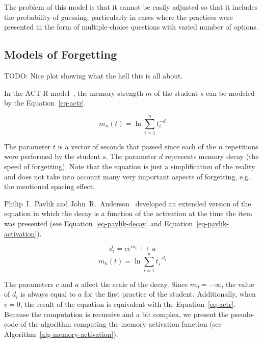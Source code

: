 The problem of this model is that it cannot be easily adjusted so that it includes the probability of guessing, particularly in cases where the practices were presented in the form of multiple-choice questions with varied number of options.

\subsection{Models of Forgetting}
\label{spacing-effect}

TODO: Nice plot showing what the hell this is all about.

In the ACT-R model~\cite{Pavlik2003}, the memory strength $m$ of the student $s$ can be modeled by the Equation~\ref{eq-actr}.

\begin{equation} \label{eq-actr}
  m_n(t) = \ln{\sum_{i=1}^{n} t_{i}^{-d}}
\end{equation}

The parameter $t$ is a vector of seconds that passed since each of the $n$ repetitions were performed by the student $s$. The parameter $d$ represents memory decay (the speed of forgetting). Note that the equation is just a simplification of the reality and does not take into account many very important aspects of forgetting, e.g. the mentioned spacing effect.

Philip~I.~Pavlik and John~R.~Anderson~\cite{Pavlik2005} developed an extended version of the equation in which the decay is a function of the activation at the time the item was presented (see Equation~\ref{eq-pavlik-decay} and Equation~\ref{eq-pavlik-activation}).

\begin{equation} \label{eq-pavlik-decay}
  d_i = ce^{m_{i-1}} + a
\end{equation}
\begin{equation} \label{eq-pavlik-activation}
  m_n(t) = \ln{\sum_{i=1}^{n} t_{i}^{-d_i}}
\end{equation}

The parameters $c$ and $a$ affect the scale of the decay. Since $m_0 = -\infty$, the value of $d_i$ is always equal to $a$ for the first practice of the student. Additionally, when $c = 0$, the result of the equation is equivalent with the Equation~\ref{eq-actr}. Because the computation is recursive and a bit complex, we present the pseudo-code of the algorithm computing the memory activation function (see Algorithm~\ref{alg-memory-activation}).

